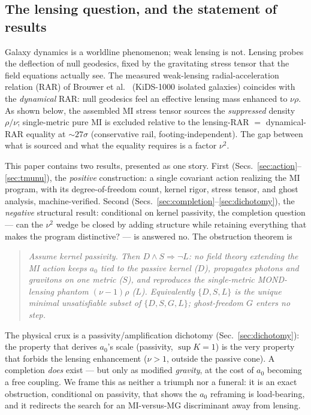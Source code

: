 \documentclass[11pt]{article}
\begin{document}
\subsection{The lensing question, and the statement of results}

Galaxy dynamics is a worldline phenomenon; weak lensing is not. Lensing probes the deflection of null geodesics, fixed by the gravitating stress tensor that the field equations actually see. The measured weak-lensing radial-acceleration relation (RAR) of Brouwer et al.\ \cite{brouwer2021} (KiDS-1000 isolated galaxies) coincides with the \emph{dynamical} RAR: null geodesics feel an effective lensing mass enhanced to $\nu\rho$. As shown below, the assembled MI stress tensor sources the \emph{suppressed} density $\rho/\nu$; single-metric pure MI is excluded relative to the lensing-RAR $=$ dynamical-RAR equality at ${\sim}27\sigma$ (conservative rail, footing-independent). The gap between what is sourced and what the equality requires is a factor $\nu^2$.

This paper contains two results, presented as one story. First (Secs.~\ref{sec:action}--\ref{sec:tmunu}), the \emph{positive} construction: a single covariant action realizing the MI program, with its degree-of-freedom count, kernel rigor, stress tensor, and ghost analysis, machine-verified. Second (Secs.~\ref{sec:completion}--\ref{sec:dichotomy}), the \emph{negative} structural result: conditional on kernel passivity, the completion question --- can the $\nu^2$ wedge be closed by adding structure while retaining everything that makes the program distinctive? --- is answered no. The obstruction theorem is
\begin{quote}
\emph{Assume kernel passivity. Then $D\wedge S\Rightarrow\lnot L$: no field theory extending the MI action keeps $a_0$ tied to the passive kernel ($D$), propagates photons and gravitons on one metric ($S$), and reproduces the single-metric MOND-lensing phantom $(\nu-1)\rho$ ($L$). Equivalently $\{D,S,L\}$ is the unique minimal unsatisfiable subset of $\{D,S,G,L\}$; ghost-freedom $G$ enters no step.}
\end{quote}
The physical crux is a passivity/amplification dichotomy (Sec.~\ref{sec:dichotomy}): the property that derives $a_0$'s scale (passivity, $\sup K=1$) is the very property that forbids the lensing enhancement ($\nu>1$, outside the passive cone). A completion \emph{does} exist --- but only as modified \emph{gravity}, at the cost of $a_0$ becoming a free coupling. We frame this as neither a triumph nor a funeral: it is an exact obstruction, conditional on passivity, that shows the $a_0$ reframing is load-bearing, and it redirects the search for an MI-versus-MG discriminant away from lensing.
\end{document}
